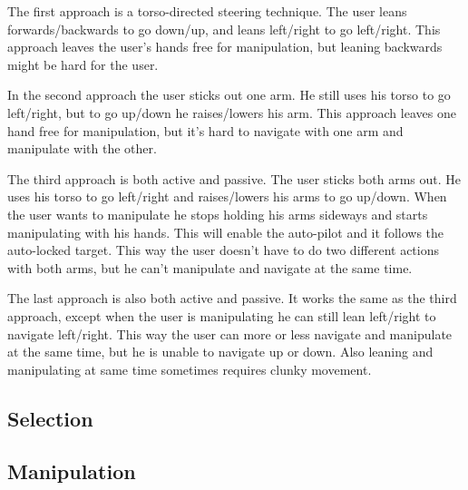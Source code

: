 \documentclass{acm_proc_article-sp}
\begin{document}
The first approach is a torso-directed steering technique. The user leans forwards/backwards to go down/up, and leans left/right to go left/right. This approach leaves the user's hands free for manipulation, but leaning backwards might be hard for the user.

In the second approach the user sticks out one arm. He still uses his torso to go left/right, but to go up/down he raises/lowers his arm. This approach leaves one hand free for manipulation, but it's hard to navigate with one arm and manipulate with the other.

The third approach is both active and passive. The user sticks both arms out. He uses his torso to go left/right and raises/lowers his arms to go up/down. When the user wants to manipulate he stops holding his arms sideways and starts manipulating with his hands. This will enable the auto-pilot and it follows the auto-locked target.\newline
This way the user doesn't have to do two different actions with both arms, but he can't manipulate and navigate at the same time.

The last approach is also both active and passive. It works the same as the third approach, except when the user is manipulating he can still lean left/right to navigate left/right. \newline
This way the user can more or less navigate and manipulate at the same time, but he is unable to navigate up or down. Also leaning and manipulating at same time sometimes requires clunky movement.


\subsection{Selection}
\subsection{Manipulation}


\end{document}
